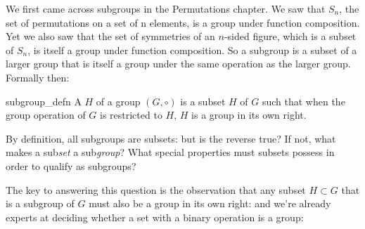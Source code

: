  We first came across subgroups in the Permutations chapter.  We saw that $S_n$, the set of permutations on a set of n elements, is a group under function composition.  Yet we also saw that the set of symmetries of an $n$-sided figure, which is a subset of $S_n$, is itself a group under function composition.  So a subgroup is a subset of a larger group that is itself a group under the same operation as the larger group.  Formally then: 

\begin{defn}{subgroup_defn}
A  $H$ of a group $(G,\circ)$ is a subset $H$ of $G$ such that when the group operation of $G$ is restricted to $H$, $H$ is a group in its own right. 
\end{defn}

By definition, all subgroups are subsets: but is the reverse true? If not, what makes a sub\emph{set} a sub\emph{group}? What special  properties must subsets possess in order to qualify as subgroups?

The key to answering this question is the observation that any subset $H \subset G$ that is a subgroup of $G$ must also be a group in its own right: and we're already experts at deciding whether a set with a binary operation is a group: 

